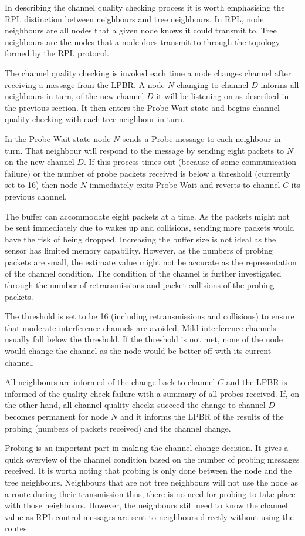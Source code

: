 In describing the channel quality checking process it is worth emphasising the RPL distinction between neighbours and tree neighbours. In RPL, node neighbours are all nodes that a given node knows it could transmit to. Tree neighbours are the nodes that a node does transmit to through the topology formed by the RPL protocol.

The channel quality checking is invoked each time a node changes channel after receiving a message from the LPBR. A node $N$ changing to channel $D$ informs all neighbours in turn, of the new channel $D$ it will be listening on as described in the previous section. It then enters the Probe Wait state and begins channel quality checking with each tree neighbour in turn.  

In the Probe Wait state node $N$ sends a Probe message to each neighbour in turn. That neighbour will respond to the message by sending eight packets to $N$ on the new channel $D$. If this process times out (because of some communication failure) or the number of probe packets received is below a threshold (currently set to 16) then node $N$ immediately exits Probe Wait and reverts to channel $C$ its previous channel. 

The buffer can accommodate eight packets at a time. As the packets might not be sent immediately due to wakes up and collisions, sending more packets would have the risk of being dropped. Increasing the buffer size is not ideal as the sensor has limited memory capability. However, as the numbers of probing packets are small, the estimate value might not be accurate as the representation of the channel condition. The condition of the channel is further investigated through the number of retransmissions and packet collisions of the probing packets. 

The threshold is set to be 16 (including retransmissions and collisions) to ensure that moderate interference channels are avoided. Mild interference channels usually fall below the threshold. If the threshold is not met, none of the node would change the channel as the node would be better off with its current channel. 

All neighbours are informed of the change back to channel $C$ and the LPBR is informed of the quality check failure with a summary of all probes received.
If, on the other hand, all channel quality checks succeed the change to channel $D$ becomes permanent for node $N$ and it informs the LPBR of the results of the probing (numbers of packets received) and the channel change.

Probing is an important part in making the channel change decision. It gives a quick overview of the channel condition based on the number of probing messages received. It is worth noting that probing is only done between the node and the tree neighbours. Neighbours that are not tree neighbours will not use the node as a route during their transmission thus, there is no need for probing to take place with those neighbours. However, the neighbours still need to know the channel value as RPL control messages are sent to neighbours directly without using the routes.

